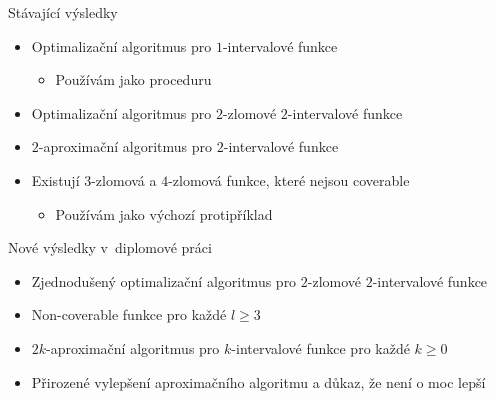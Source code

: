 \documentclass{beamer}
\theoremstyle{remark}
\begin{document}
\begin{frame}{Stávající výsledky}
\begin{itemize}
\item
Optimalizační algoritmus pro $1$-intervalové funkce \citep{Schieber2005154}
\begin{itemize}
\item Používám jako proceduru
\end{itemize}

\item
Optimalizační algoritmus pro $2$-zlomové $2$-intervalové funkce \citep{Dubovsky2012}

\item
$2$-aproximační algoritmus pro $2$-intervalové funkce \citep{Dubovsky2012}

\item Existují $3$-zlomová a $4$-zlomová funkce,
které nejsou coverable \citep{Dubovsky2012}
\begin{itemize}
\item Používám jako výchozí protipříklad
\end{itemize}
\end{itemize}
\end{frame}

\begin{frame}{Nové výsledky v~diplomové práci}
\begin{itemize}
\item Zjednodušený optimalizační algoritmus pro $2$-zlomové $2$-intervalové funkce
\item Non-coverable funkce pro každé $l \geq 3$
\item $2k$-aproximační algoritmus pro $k$-intervalové funkce pro každé $k \geq 0$
\item Přirozené vylepšení aproximačního algoritmu a důkaz, že není o moc lepší
\end{itemize}
\end{frame}
\end{document}
